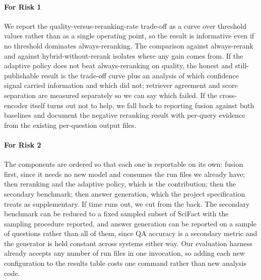 \documentclass[sigconf,nonacm]{acmart}
\begin{document}
\paragraph{For Risk 1} We report the quality-versus-reranking-rate trade-off as a
curve over threshold values rather than as a single operating point, so the
result is informative even if no threshold dominates always-reranking. The
comparison against always-rerank and against hybrid-without-rerank isolates
where any gain comes from. If the adaptive policy does not beat always-reranking
on quality, the honest and still-publishable result is the trade-off curve plus
an analysis of which confidence signal carried information and which did not;
retriever agreement and score separation are measured separately so we can say
which failed. If the cross-encoder itself turns out not to help, we fall back to
reporting fusion against both baselines and document the negative reranking
result with per-query evidence from the existing per-question output files.

\paragraph{For Risk 2} The components are ordered so that each one is reportable
on its own: fusion first, since it needs no new model and consumes the run files
we already have; then reranking and the adaptive policy, which is the
contribution; then the secondary benchmark; then answer generation, which the
project specification treats as supplementary. If time runs out, we cut from the
back. The secondary benchmark can be reduced to a fixed sampled subset of
SciFact with the sampling procedure reported, and answer generation can be
reported on a sample of questions rather than all of them, since QA accuracy is
a secondary metric and the generator is held constant across systems either way.
Our evaluation harness already accepts any number of run files in one
invocation, so adding each new configuration to the results table costs one
command rather than new analysis code.
\end{document}
